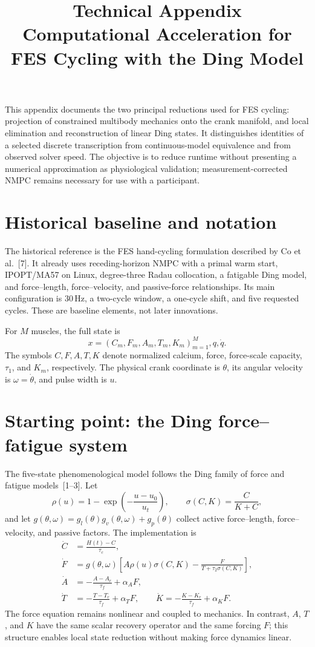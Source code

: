 \documentclass[10pt]{article}
\title{Technical Appendix\\Computational Acceleration for FES Cycling with the Ding Model}
\author{}
\date{}
\newcommand{\Hz}{\,\mathrm{Hz}}
\begin{document}
\maketitle

\noindent This appendix documents the two principal reductions used for FES cycling: projection of constrained multibody mechanics onto the crank manifold, and local elimination and reconstruction of linear Ding states. It distinguishes identities of a selected discrete transcription from continuous-model equivalence and from observed solver speed. The objective is to reduce runtime without presenting a numerical approximation as physiological validation; measurement-corrected NMPC remains necessary for use with a participant.

\section{Historical baseline and notation}

The historical reference is the FES hand-cycling formulation described by Co et al.~[7]. It already uses receding-horizon NMPC with a primal warm start, IPOPT/MA57 on Linux, degree-three Radau collocation, a fatigable Ding model, and force--length, force--velocity, and passive-force relationships. Its main configuration is $30\Hz$, a two-cycle window, a one-cycle shift, and five requested cycles. These are baseline elements, not later innovations.

For $M$ muscles, the full state is
\[
x=\left(C_m,F_m,A_m,T_m,K_m\right)_{m=1}^{M},q,\dot q.
\]
The symbols $C,F,A,T,K$ denote normalized calcium, force, force-scale capacity, $\tau_1$, and $K_m$, respectively. The physical crank coordinate is $\theta$, its angular velocity is $\omega=\dot\theta$, and pulse width is $u$.

\section{Starting point: the Ding force--fatigue system}

The five-state phenomenological model follows the Ding family of force and fatigue models~[1--3]. Let
\[
\rho(u)=1-\exp\left(-\frac{u-u_0}{u_t}\right), \qquad
\sigma(C,K)=\frac{C}{K+C},
\]
and let $g(\theta,\omega)=g_l(\theta)g_v(\theta,\omega)+g_p(\theta)$ collect active force--length, force--velocity, and passive factors. The implementation is
\begin{align}
\dot C &= \frac{H(t)-C}{\tau_c},\\
\dot F &= g(\theta,\omega)\left[A\rho(u)\sigma(C,K)-\frac{F}{T+\tau_2\sigma(C,K)}\right],\\
\dot A &= -\frac{A-A_r}{\tau_f}+\alpha_A F,\\
\dot T &= -\frac{T-T_r}{\tau_f}+\alpha_T F, \qquad
\dot K = -\frac{K-K_r}{\tau_f}+\alpha_K F.
\end{align}
The force equation remains nonlinear and coupled to mechanics. In contrast, $A$, $T$, and $K$ have the same scalar recovery operator and the same forcing $F$; this structure enables local state reduction without making force dynamics linear.
\end{document}
